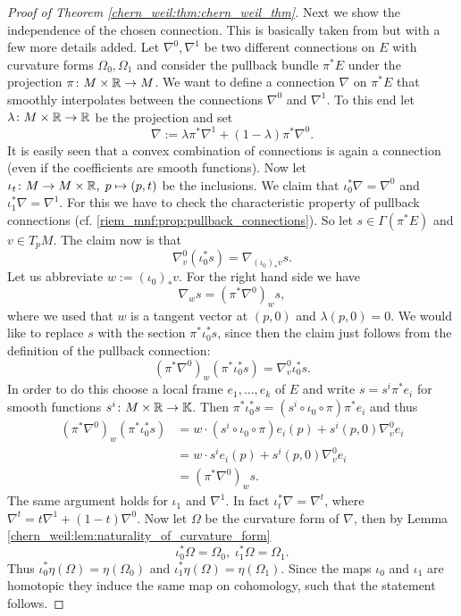 \begin{proof}[Proof of Theorem \ref{chern_weil:thm:chern_weil_thm}]
    Next we show the independence of the chosen connection. This is basically taken from \cite{rahman2017} but with a few more details added. Let $\nabla^0, \nabla^1$ be two different connections on $E$ with curvature forms $\Omega_0, \Omega_1$ and consider the pullback bundle $\pi^\ast E$ under the projection $\pi \colon M \times \mathbb{R} \to M$. We want to define a connection $\nabla$ on $\pi^\ast E$ that smoothly interpolates between the connections $\nabla^0$ and $\nabla^1$. To this end let $\lambda \colon M \times \mathbb{R} \to \mathbb{R}$ be the projection and set 
    \[
    \nabla := \lambda \pi^\ast \nabla^1 + (1 - \lambda) \pi^\ast \nabla^0.
    \]
    It is easily seen that a convex combination of connections is again a connection (even if the coefficients are smooth functions). Now let $\iota_t \colon M \to M \times \mathbb{R}, \; p \mapsto (p,t)$ be the inclusions. We claim that $\iota_0^\ast \nabla = \nabla^0$ and $\iota_1^\ast \nabla = \nabla^1$. For this we have to check the characteristic property of pullback connections (cf. \ref{riem_mnf:prop:pullback_connections}). So let $s \in \Gamma(\pi^\ast E)$ and $v \in T_p M$. The claim now is that
    \[
    \nabla^0_v (\iota_0^\ast s) = \nabla_{(\iota_0)_\ast v} s.
    \]
    Let us abbreviate $w:= (\iota_0)_\ast v$. For the right hand side we have
    \[
    \nabla_{w} s = (\pi^\ast \nabla^0)_{w} s,
    \]
    where we used that $w$ is a tangent vector at $(p,0)$ and $\lambda(p,0) = 0$. We would like to replace $s$ with the section $\pi^\ast\iota_0^\ast s$, since then the claim just follows from the definition of the pullback connection: 
    \[
    (\pi^\ast \nabla^0)_{w} (\pi^\ast\iota_0^\ast s) = \nabla^0_v \iota_0^\ast s.
    \]
    In order to do this choose a local frame $e_1,\ldots,e_k$ of $E$ and write $s = s^i \pi^\ast e_i$ for smooth functions $s^i \colon M \times \mathbb{R} \to \mathbb{K}$. Then $\pi^\ast\iota_0^\ast s = (s^i \circ \iota_0 \circ \pi) \pi^\ast e_i$ and thus 
    \begin{align*}
    (\pi^\ast \nabla^0)_{w} (\pi^\ast\iota_0^\ast s) & = w \cdot (s^i \circ \iota_0 \circ \pi)  e_i(p) + s^i(p,0) \nabla^0_v e_i \\
        &= w \cdot s^i  e_i(p) + s^i(p,0) \nabla^0_v e_i \\
        &= (\pi^\ast \nabla^0)_{w} s.
    \end{align*}
    The same argument holds for $\iota_1$ and $\nabla^1$. In fact $\iota_t^\ast \nabla = \nabla^t$, where $\nabla^t = t\nabla^1 + (1-t)\nabla^0$. Now let $\Omega$ be the curvature form of $\nabla$, then by Lemma \ref{chern_weil:lem:naturality_of_curvature_form}
    \[
    \iota_0^\ast \Omega = \Omega_0, \; \iota_1^\ast \Omega = \Omega_1.
    \]
    Thus $\iota_0^\ast \eta(\Omega) = \eta(\Omega_0)$ and $\iota_1^\ast \eta(\Omega) = \eta(\Omega_1)$. Since the maps $\iota_0$ and $\iota_1$ are homotopic they induce the same map on cohomology, such that the statement follows.
    \end{proof}

